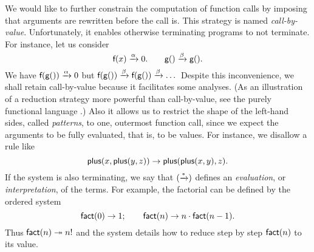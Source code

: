 We would like to further constrain the computation of function calls
by imposing that arguments are rewritten before the call is. This
strategy is named \emph{call\hyp{}by\hyp{}value}.\label{def:call-by-value} Unfortunately, it
enables otherwise terminating programs to not terminate. For instance,
let us consider
\begin{equation*}
\textsf{f}(x) \xrightarrow{\smash{\alpha}} 0.\qquad
\textsf{g}() \xrightarrow{\smash{\beta}} \textsf{g}().
\end{equation*}
We have \(\textsf{f}(\textsf{g}()) \xrightarrow{\smash{\alpha}} 0\) but
\(\textsf{f}(\textsf{g}()) \xrightarrow{\smash{\beta}} \textsf{f}(\textsf{g}())
\xrightarrow{\smash{\beta}} \dots\) Despite this inconvenience, we
shall retain call\hyp{}by\hyp{}value because it facilitates some
analyses. (As an illustration of a reduction strategy more powerful
than call-by-value, see the purely functional language \Haskell
\citep{DoetsVanEijck_2004}.) Also it allows us to restrict the shape
of the left\hyp{}hand sides, called \emph{patterns}, to one, outermost function call, since we expect
the arguments to be fully evaluated, that is, to be values. For
instance, we disallow a rule like
\begin{equation*}
\textsf{plus}(x,\textsf{plus}(y,z)) \rightarrow
\textsf{plus}(\textsf{plus}(x,y),z).
\end{equation*}
If the system is also terminating, we say that
\((\xrightarrow{\smash{*}})\) defines an \emph{evaluation}, or \emph{interpretation}, of the terms. For example,
the factorial
 can be defined by the ordered
system
\begin{equation}
\textsf{fact}(0) \rightarrow 1;\qquad
\textsf{fact}(n) \rightarrow n \cdot \textsf{fact}(n-1).
\label{def:fact}
\end{equation}
Thus \(\textsf{fact}(n) \twoheadrightarrow n!\) and the system details
how to reduce step by step \(\textsf{fact}(n)\) to its value.


